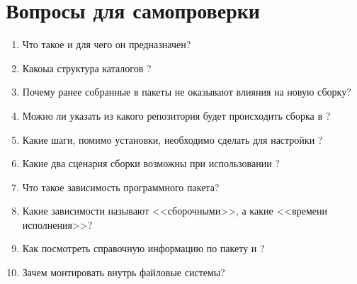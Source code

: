 \section{Вопросы для самопроверки}

\begin{enumerate}
    \item Что такое  и для чего он предназначен?
    \item Какоыа структура каталогов ?
    \item Почему ранее собранные в  пакеты не оказывают влияния на новую сборку?
    \item Можно ли указать из какого репозитория будет происходить сборка в ?
    \item Какие шаги, помимо установки, необходимо сделать для настройки ?
    \item Какие два сценария сборки возможны при использовании ?
    \item Что такое зависимость программного пакета?
    \item Какие зависимости называют <<сборочными>>, а какие <<времени исполнения>>?
    \item Как посмотреть справочную информацию по пакету  и ?
    \item Зачем монтировать внутрь  файловые системы?
\end{enumerate}